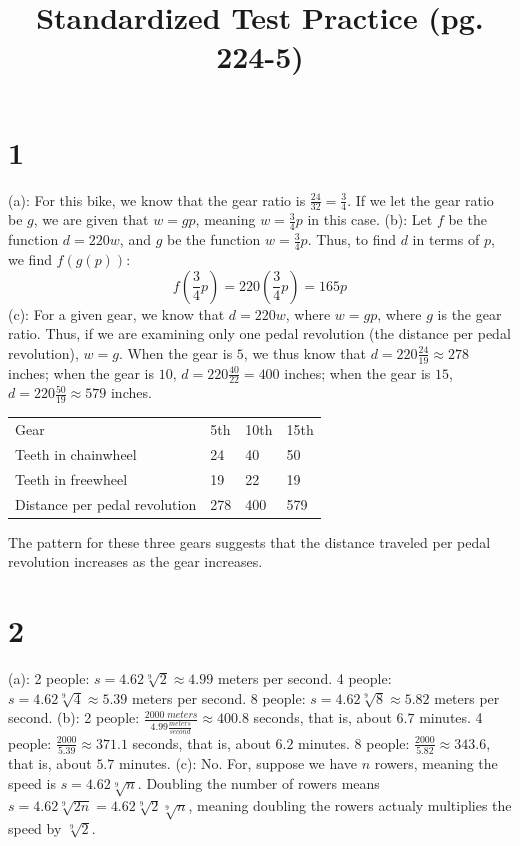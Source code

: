 \documentclass{article}
\title{Standardized Test Practice (pg. 224-5)}
\theoremstyle{definition}
\newcommand{\?}{\stackrel{?}{=}}
\begin{document}
\maketitle

\section*{1}
(a): For this bike, we know that the gear ratio is $\frac{24}{32}=\frac{3}{4}$. If we let the gear ratio be $g$, we are given that 
$w=gp$, meaning $w=\frac{3}{4}p$ in this case.\newline
(b): Let $f$ be the function $d=220w$, and $g$ be the function $w=\frac{3}{4}p$. Thus, to find $d$ in terms of $p$, we find $f(g(p))$:
\[ f(\frac{3}{4}p)=220(\frac{3}{4}p)=165p \]
(c): 
For a given gear, we know that $d=220w$, where $w=gp$, where $g$ is the gear ratio. Thus, if we are examining only one pedal revolution (the distance 
per pedal revolution), $w=g$. When the gear is $5$, we thus know that $d=220\frac{24}{19}\approx 278$ inches; when the gear is $10$, 
$d=220\frac{40}{22}=400$ inches; when the gear is $15$, $d=220\frac{50}{19}\approx 579$ inches.
\begin{center}
\begin{tabular}{l|l|l|l}
	Gear & 5th & 10th & 15th \\
	Teeth in chainwheel & 24 & 40 & 50 \\
	Teeth in freewheel & 19 & 22 & 19 \\
	Distance per pedal revolution & 278 & 400 & 579
\end{tabular}
\end{center}
The pattern for these three gears suggests that the distance traveled per pedal revolution increases as the gear increases.

\section*{2}
(a): 2 people: $s=4.62\sqrt[9]{2}\approx 4.99$ meters per second. 4 people: $s=4.62\sqrt[9]{4}\approx 5.39$ meters per second. 8 people: 
$s=4.62\sqrt[9]{8}\approx 5.82$ meters per second.\newline
(b): 2 people: $\frac{2000\; meters}{4.99\frac{meters}{second}}\approx 400.8$ seconds, that is, about $6.7$ minutes. 4 people: 
$\frac{2000}{5.39}\approx 371.1$ seconds, that is, about $6.2$ minutes. 8 people: $\frac{2000}{5.82}\approx 343.6$, that is, about $5.7$ minutes.\newline
(c): No. For, suppose we have $n$ rowers, meaning the speed is $s=4.62\sqrt[9]{n}$. Doubling the number of rowers means
$s=4.62\sqrt[9]{2n}=4.62\sqrt[9]{2}\sqrt[9]{n}$, meaning doubling the rowers actualy multiplies the speed by $\sqrt[9]{2}$.
\end{document}
